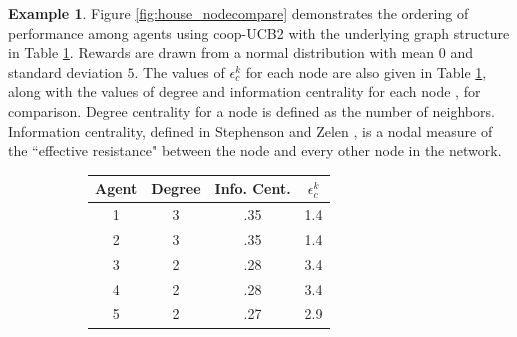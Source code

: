 \documentclass[final,5p,times,twocolumn]{elsarticle}
\theoremstyle{definition}
\newtheorem{example}{Example}
\begin{document}
\begin{example}\label{ex:house_nodecompare}
	Figure \ref{fig:house_nodecompare} demonstrates the ordering of performance among agents using coop-UCB2 with the underlying graph structure in Table \ref{table:5agentgraph}. Rewards are drawn from a normal distribution with mean $0$ and standard deviation $5$.  The values of $\epsilon_c^k$ for each node are also given in Table \ref{table:5agentgraph}, along with the values of degree and information centrality for each node \cite{Poulakakis2015}, for comparison.  Degree centrality for a node is defined as the number of neighbors.  Information centrality, defined in Stephenson and Zelen \cite{STEPHENSON19891}, is a nodal measure of the ``effective resistance" between the  node and  every other node in the network.

\begin{figure}[ht!]
	\centering
	\begin{subfigure}{.35\linewidth}
		\centering
	\end{subfigure}%
	\begin{subfigure}{.65\linewidth}
		\begin{tabular}{c | c | c | c}
			Agent & Degree & Info. Cent. & $\epsilon_c^k$ \\ \hline
			1     & 3      & .35           & 1.4  \\ 
			2     & 3      & .35          & 1.4  \\ 
			3     & 2      & .28          & 3.4  \\ 
			4     & 2      & .28           & 3.4  \\
			5     & 2      & .27           & 2.9 
		\end{tabular}
	\end{subfigure}
	\label{table:5agentgraph}
\end{figure}


\end{example}
\end{document}
